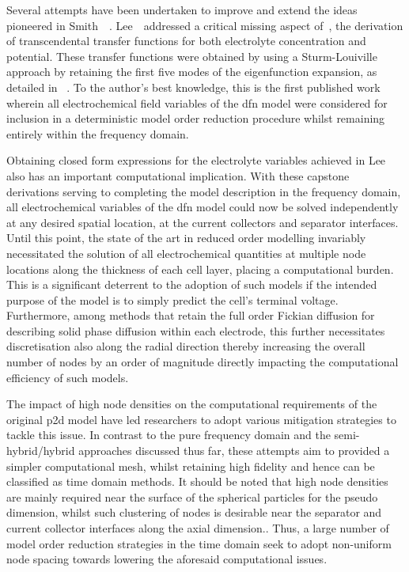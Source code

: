 Several attempts have been undertaken to  improve and extend the ideas pioneered
in  Smith~\etal{}~\cite{Smith2007}.  Lee~\etal{}~addressed  a  critical  missing
aspect  of~\cite{Smith2007}, \viz{}  the derivation  of transcendental  transfer
functions  for  both electrolyte  concentration  and  potential. These  transfer
functions were  obtained by  using a Sturm-Louiville  approach by  retaining the
first five modes of the eigenfunction expansion, as detailed in~\cite{Lee2012} .
To the  author's best knowledge,  this is the  first published work  wherein all
electrochemical  field variables  of  the \gls{dfn}  model  were considered  for
inclusion in  a deterministic model  order reduction procedure  whilst remaining
entirely within the frequency domain.

Obtaining  closed form  expressions for  the electrolyte  variables achieved  in
Lee\etal{} also has an important  computational implication. With these capstone
derivations serving to completing the model description in the frequency domain,
all  electrochemical  variables of  the  \gls{dfn}  model  could now  be  solved
independently at any  desired spatial location, \eg{} at  the current collectors
and separator  interfaces. Until  this point,  the state of  the art  in reduced
order  modelling invariably  necessitated  the solution  of all  electrochemical
quantities at  multiple node locations along  the thickness of each  cell layer,
placing a computational burden. This is  a significant deterrent to the adoption
of such  models if the intended  purpose of the  model is to simply  predict the
cell's terminal voltage.  Furthermore, among methods that retain  the full order
Fickian diffusion  for describing solid  phase diffusion within  each electrode,
this further necessitates discretisation also along the radial direction thereby
increasing  the overall  number  of  nodes by  an  order  of magnitude  directly
impacting the computational efficiency of such models.

The  impact of  high node  densities on  the computational  requirements of  the
original  \gls{p2d}  model have  led  researchers  to adopt  various  mitigation
strategies to  tackle this issue. In  contrast to the pure  frequency domain and
the  semi-hybrid/hybrid approaches  discussed thus  far, these  attempts aim  to
provided a simpler computational mesh,  whilst retaining high fidelity and hence
can be  classified as  time domain methods.  It should be  noted that  high node
densities are  mainly required near the  surface of the spherical  particles for
the  pseudo   dimension,  whilst  such  clustering of  nodes  is
desirable near  the separator and  current collector interfaces along  the axial
dimension..  Thus, a
large number  of model  order reduction  strategies in the  time domain  seek to
adopt  non-uniform node  spacing  towards lowering  the aforesaid  computational
issues.


